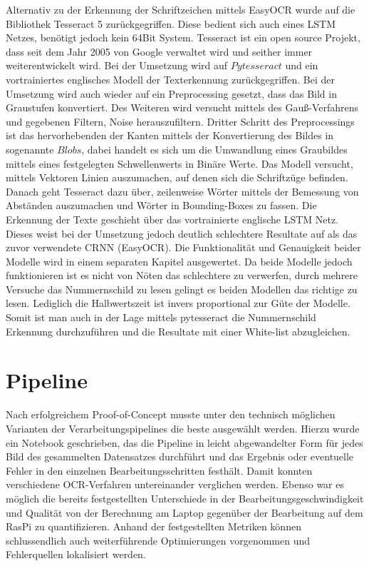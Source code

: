 Alternativ zu der Erkennung der Schriftzeichen mittels EasyOCR wurde auf die Bibliothek Tesseract 5 zurückgegriffen. Diese bedient sich auch eines LSTM Netzes, benötigt jedoch kein 64Bit System. Tesseract ist ein open source Projekt, dass seit dem Jahr 2005 von Google verwaltet wird und seither immer weiterentwickelt wird. Bei der Umsetzung wird auf $Pytesseract$ und ein vortrainiertes englisches Modell der Texterkennung zurückgegriffen. \autocite[Vgl.][]{Tesserac98}
Bei der Umsetzung wird auch wieder auf ein Preprocessing gesetzt, dass das Bild in Graustufen konvertiert. Des Weiteren wird versucht mittels des Gauß-Verfahrens und gegebenen Filtern, Noise herauszufiltern. Dritter Schritt des Preprocessings ist das hervorhebenden der Kanten mittels der Konvertierung des Bildes in sogenannte $Blobs$, dabei handelt es sich um die Umwandlung eines Graubildes mittels eines festgelegten Schwellenwerts in Binäre Werte. \autocite[Vgl.][]{8974469} %
Das Modell versucht, mittels Vektoren Linien auszumachen, auf denen sich die Schriftzüge befinden. Danach geht Tesseract dazu über, zeilenweise Wörter mittels der Bemessung von Abständen auszumachen und Wörter in Bounding-Boxes zu fassen. Die Erkennung der Texte geschieht über das vortrainierte englische LSTM Netz. Dieses weist bei der Umsetzung jedoch deutlich schlechtere Resultate auf als das zuvor verwendete CRNN (EasyOCR). Die Funktionalität und Genauigkeit beider Modelle wird in einem separaten Kapitel ausgewertet. %
Da beide Modelle jedoch funktionieren ist es nicht von Nöten das schlechtere zu verwerfen, durch mehrere Versuche das Nummernschild zu lesen gelingt es beiden Modellen das richtige zu lesen. Lediglich die Halbwertszeit ist invers proportional zur Güte der Modelle. Somit ist man auch in der Lage mittels pytesseract die Nummernschild Erkennung durchzuführen und die Resultate mit einer White-list abzugleichen.

\section{Pipeline}

Nach erfolgreichem Proof-of-Concept musste unter den technisch möglichen Varianten der Verarbeitungspipelines die beste ausgewählt werden. Hierzu wurde ein Notebook geschrieben, das die Pipeline in leicht abgewandelter Form für jedes Bild des gesammelten Datensatzes durchführt und das Ergebnis oder eventuelle Fehler in den einzelnen Bearbeitungsschritten festhält. Damit konnten verschiedene OCR-Verfahren untereinander verglichen werden. Ebenso war es möglich die bereits festgestellten Unterschiede in der Bearbeitungsgeschwindigkeit und Qualität von der Berechnung am Laptop gegenüber der Bearbeitung auf dem RasPi zu quantifizieren. Anhand der festgestellten Metriken können schlussendlich auch weiterführende Optimierungen vorgenommen und Fehlerquellen lokalisiert werden.

